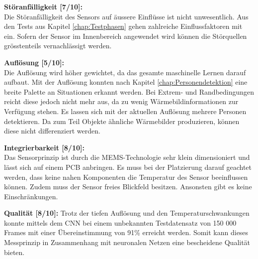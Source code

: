 \textbf{Störanfälligkeit [7/10]:} \\
Die Störanfälligkeit des Sensors auf äussere Einflüsse ist nicht unwesentlich. Aus den Tests aus Kapitel \ref{chap:Testphasen} gehen zahlreiche Einflussfaktoren mit ein. Sofern der Sensor im Innenbereich angewendet wird können die Störquellen grösstenteils vernachlässigt werden.

\textbf{Auflösung [5/10]:} \\
Die Auflösung wird höher gewichtet, da das gesamte maschinelle Lernen darauf aufbaut. Mit der Auflösung konnten nach Kapitel \ref{chap:Personendetektion} eine breite Palette an Situationen erkannt werden. Bei Extrem- und Randbedingungen reicht diese jedoch nicht mehr aus, da zu wenig Wärmebildinformationen zur Verfügung stehen. Es lassen sich mit der aktuellen Auflösung mehrere Personen detektieren. Da zum Teil Objekte ähnliche Wärmebilder produzieren, können diese nicht differenziert werden.  

\textbf{Integrierbarkeit [8/10]:} \\
Das Sensorprinzip ist durch die MEMS-Technologie sehr klein dimensioniert und lässt sich auf einem \ac{PCB} anbringen. Es muss bei der Platzierung darauf geachtet werden, dass keine nahen Komponenten die Temperatur des Sensor beeinflussen können. Zudem muss der Sensor freies Blickfeld besitzen. Ansonsten gibt es keine Einschränkungen. 

\textbf{Qualität [8/10]:}
Trotz der tiefen Auflösung und den Temperaturschwankungen konnte mittels dem \ac{CNN} bei einem unbekannten Testdatensatz von 150 000 Frames mit einer Übereinstimmung von 91\% erreicht werden. Somit kann dieses Messprinzip in Zusammenhang mit neuronalen Netzen eine bescheidene Qualität bieten.

